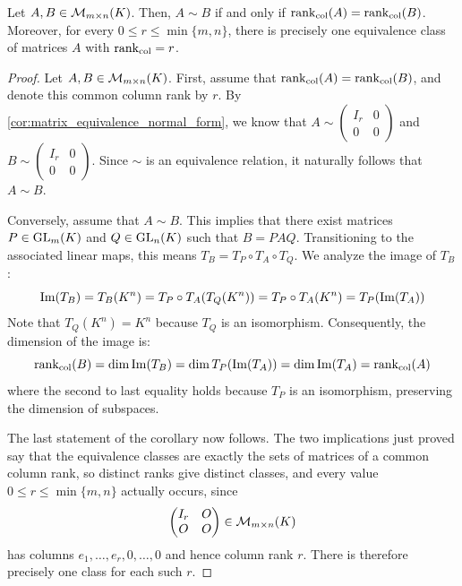 \begin{corollary}
\label{cor:matrix_rank_equivalence_classification}
Let $A, B \in \mathcal{M}_{m \times n}(K)$. Then, $A \sim B$ if and only if $\operatorname{rank}_{\text{col}}(A) = \operatorname{rank}_{\text{col}}(B)$. Moreover, for every $0 \le r \le \min\{m, n\}$, there is precisely one equivalence class of matrices $A$ with $\operatorname{rank}_{\text{col}} = r$.
\end{corollary}

\begin{proof}
Let $A, B \in \mathcal{M}_{m \times n}(K)$. First, assume that $\operatorname{rank}_{\text{col}}(A) = \operatorname{rank}_{\text{col}}(B)$, and denote this common column rank by $r$. By \cref{cor:matrix_equivalence_normal_form}, we know that $A \sim \left(\begin{smallmatrix} I_r & 0 \\ 0 & 0 \end{smallmatrix}\right)$ and $B \sim \left(\begin{smallmatrix} I_r & 0 \\ 0 & 0 \end{smallmatrix}\right)$. Since $\sim$ is an equivalence relation, it naturally follows that $A \sim B$.

Conversely, assume that $A \sim B$. This implies that there exist matrices $P \in \operatorname{GL}_m(K)$ and $Q \in \operatorname{GL}_n(K)$ such that $B = PAQ$. Transitioning to the associated linear maps, this means $T_B = T_P \circ T_A \circ T_Q$. We analyze the image of $T_B$:
\begin{equation*}
    \operatorname{Im}(T_B) = T_B(K^n) = T_P \circ T_A(T_Q(K^n)) = T_P \circ T_A(K^n) = T_P(\operatorname{Im}(T_A))
\end{equation*}
Note that $T_Q(K^n) = K^n$ because $T_Q$ is an isomorphism. Consequently, the dimension of the image is:
\begin{equation*}
    \operatorname{rank}_{\text{col}}(B) = \dim \operatorname{Im}(T_B) = \dim T_P(\operatorname{Im}(T_A)) = \dim \operatorname{Im}(T_A) = \operatorname{rank}_{\text{col}}(A)
\end{equation*}
where the second to last equality holds because $T_P$ is an isomorphism, preserving the dimension of subspaces.

The last statement of the corollary now follows. The two implications just proved say that the equivalence classes are exactly the sets of matrices of a common column rank, so distinct ranks give distinct classes, and every value $0 \le r \le \min\{m, n\}$ actually occurs, since
\[
\begin{pmatrix} I_r & O \\ O & O \end{pmatrix} \in \mathcal{M}_{m \times n}(K)
\]
has columns $e_1, \dots, e_r, 0, \dots, 0$ and hence column rank $r$. There is therefore precisely one class for each such $r$.
\end{proof}

